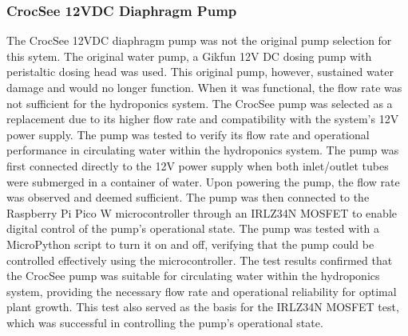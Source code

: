 \documentclass[12pt]{article} %
\begin{document}
\subsubsection{CrocSee 12VDC Diaphragm Pump}
\noindent The CrocSee 12VDC diaphragm pump \cite{ref_crocsee} was not the original pump selection for this sytem. The original water pump, a Gikfun 12V DC dosing pump with peristaltic dosing head \cite{ref_gikfun} was used. This original pump, however, sustained water damage and would no longer function. When it was functional, the flow rate was not sufficient for the hydroponics system. The CrocSee pump was selected as a replacement due to its higher flow rate and compatibility with the system's 12V power supply. The pump was tested to verify its flow rate and operational performance in circulating water within the hydroponics system. The pump was first connected directly to the 12V power supply when both inlet/outlet tubes were submerged in a container of water. Upon powering the pump, the flow rate was observed and deemed sufficient. The pump was then connected to the Raspberry Pi Pico W microcontroller through an IRLZ34N MOSFET to enable digital control of the pump's operational state. The pump was tested with a MicroPython script to turn it on and off, verifying that the pump could be controlled effectively using the microcontroller. The test results confirmed that the CrocSee pump was suitable for circulating water within the hydroponics system, providing the necessary flow rate and operational reliability for optimal plant growth. This test also served as the basis for the IRLZ34N MOSFET test, which was successful in controlling the pump's operational state.
\end{document}
